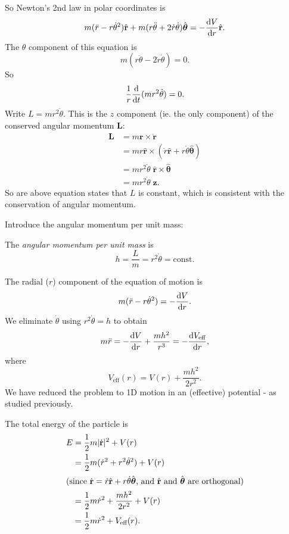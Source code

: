 \documentclass[a4paper]{article}
\begin{document}
So Newton's 2nd law in polar coordinates is
\[
  m(\ddot{r} - r\dot{\theta}^2)\hat{\mathbf{r}} + m(r\ddot{\theta} + 2\dot{r}\dot{\theta})\hat{\boldsymbol\theta} = -\frac{\mathrm{d} V}{\mathrm{d} r}\hat{\mathbf{r}}.
\]
The $\theta$ component of this equation is
\[
  m(r\ddot{\theta} - 2\dot{r}\dot{\theta}) = 0.
\]
So
\[
  \frac{1}{r}\frac{\mathrm{d} }{\mathrm{d} t}(mr^2 \dot{\theta}) = 0.
\]
Write $L = mr^2 \dot{\theta}$. This is the $z$ component (ie. the only component) of the conserved angular momentum $\mathbf{L}$:
\begin{align*}
  \mathbf{L} &= m\mathbf{r}\times \dot{\mathbf{r}}\\
  &= mr\hat{\mathbf{r}}\times (\dot{r}\hat{\mathbf{r}} + r\dot{\theta}\hat{\boldsymbol\theta})\\
  &= mr^2 \dot{\theta}\; \hat{\mathbf{r}}\times \hat{\boldsymbol\theta}\\
  &= mr^2 \dot{\theta}\; \hat{\mathbf{z}}.
\end{align*}
So are above equation states that $L$ is constant, which is consistent with the conservation of angular momentum.

Introduce the angular momentum per unit mass:
\begin{notation}
  The \emph{angular momentum per unit mass} is
  \[
    h = \frac{L}{m} = r^2\dot\theta = \text{const.}
  \]
\end{notation}
The radial ($r$) component of the equation of motion is
\[
  m(\ddot{r} - r\dot{\theta}^2) = -\frac{\mathrm{d} V}{\mathrm{d} r}.
\]
We eliminate $\dot{\theta}$ using $r^2\dot{\theta} = h$ to obtain
\[
  m\ddot{r} = -\frac{\mathrm{d} V}{\mathrm{d} r} + \frac{mh^2}{r^3} = -\frac{\mathrm{d} V_{\text{eff}}}{\mathrm{d} r},
\]
where 
\[
  V_{\text{eff}}(r) = V(r) + \frac{mh^2}{2r^2}.
\]
We have reduced the problem to 1D motion in an (effective) potential - as studied previously.

The total energy of the particle is
\begin{align*}
  E &= \frac{1}{2}m|\dot{\mathbf{r}}|^2 + V(r)\\
  &= \frac{1}{2}m(\dot{r}^2 + r^2\dot{\theta}^2) + V(r)\\
  \intertext{(since $\dot{\mathbf{r}} = \dot{r}\hat{\mathbf{r}} + r\dot{\theta}\hat{\boldsymbol\theta}$, and $\hat{\mathbf{r}}$ and $\hat{\boldsymbol\theta}$ are orthogonal)}
  &= \frac{1}{2}m\dot{r}^2 + \frac{mh^2}{2r^2} + V(r)\\
  &= \frac{1}{2}m\dot{r}^2 + V_{\text{eff}}(r).
\end{align*}
\end{document}
